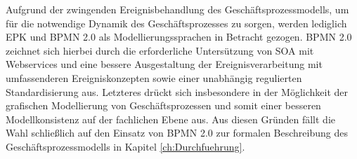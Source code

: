 Aufgrund der zwingenden Ereignisbehandlung des Geschäftsprozessmodells, um für die notwendige Dynamik des Geschäftsprozesses zu sorgen, werden lediglich \ac{EPK} und \ac{BPMN} 2.0 als Modellierungssprachen in Betracht gezogen. 
\ac{BPMN} 2.0 zeichnet sich hierbei durch die erforderliche Untersützung von SOA mit Webservices und eine bessere Ausgestaltung der Ereignisverarbeitung mit umfassenderen Ereigniskonzepten sowie einer unabhängig regulierten Standardisierung aus. Letzteres drückt sich insbesondere in der Möglichkeit der grafischen Modellierung von Geschäftsprozessen und somit einer besseren Modellkonsistenz auf der fachlichen Ebene aus. Aus diesen Gründen fällt die Wahl schließlich auf den Einsatz von \ac{BPMN} 2.0 zur formalen Beschreibung des Geschäftsprozessmodells in Kapitel \ref{ch:Durchfuehrung}. 
